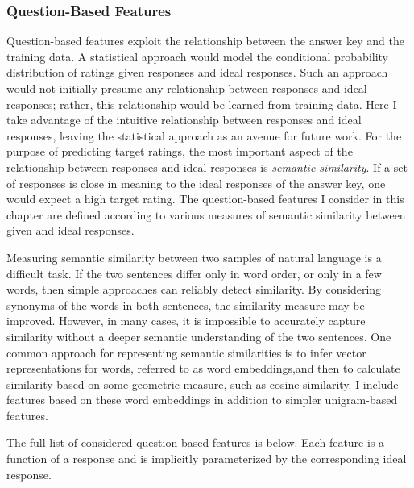 \subsubsection{Question-Based Features}
Question-based features exploit the relationship between the answer key and the training data. A statistical approach would model the conditional probability distribution of ratings given responses and ideal responses. Such an approach would not initially presume any relationship between responses and ideal responses; rather, this relationship would be learned from training data. Here I take advantage of the intuitive relationship between responses and ideal responses, leaving the statistical approach as an avenue for future work. For the purpose of predicting target ratings, the most important aspect of the relationship between responses and ideal responses is \textit{semantic similarity}. If a set of responses is close in meaning to the ideal responses of the answer key, one would expect a high target rating. The question-based features I consider in this chapter are defined according to various measures of semantic similarity between given and ideal responses. 

Measuring semantic similarity between two samples of natural language is a difficult task. If the two sentences differ only in word order, or only in a few words, then simple approaches can reliably detect similarity. By considering synonyms of the words in both sentences, the similarity measure may be improved. However, in many cases, it is impossible to accurately capture similarity without a deeper semantic understanding of the two sentences. One common approach for representing semantic similarities is to infer vector representations for words, referred to as word embeddings,and then to calculate similarity based on some geometric measure, such as cosine similarity. I include features based on these word embeddings in addition to simpler unigram-based features. 

The full list of considered question-based features is below. Each feature is a function of a response and is implicitly parameterized by the corresponding ideal response.

